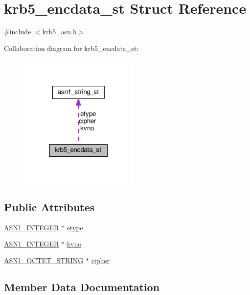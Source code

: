 \hypertarget{structkrb5__encdata__st}{}\section{krb5\+\_\+encdata\+\_\+st Struct Reference}
\label{structkrb5__encdata__st}


{\ttfamily \#include $<$krb5\+\_\+asn.\+h$>$}



Collaboration diagram for krb5\+\_\+encdata\+\_\+st\+:
\nopagebreak
\begin{figure}[H]
\begin{center}
\leavevmode
\includegraphics[width=169pt]{structkrb5__encdata__st__coll__graph}
\end{center}
\end{figure}
\subsection*{Public Attributes}
\begin{DoxyCompactItemize}
\item 
\hyperlink{ossl__typ_8h_af4335399bf9774cb410a5e93de65998b}{A\+S\+N1\+\_\+\+I\+N\+T\+E\+G\+ER} $\ast$ \hyperlink{structkrb5__encdata__st_aa930746062320a82be3d81e363dd4ebf}{etype}
\item 
\hyperlink{ossl__typ_8h_af4335399bf9774cb410a5e93de65998b}{A\+S\+N1\+\_\+\+I\+N\+T\+E\+G\+ER} $\ast$ \hyperlink{structkrb5__encdata__st_a30352f26d2741ac03df07c308f0bbb66}{kvno}
\item 
\hyperlink{ossl__typ_8h_afbd05e94e0f0430a2b729473efec88c1}{A\+S\+N1\+\_\+\+O\+C\+T\+E\+T\+\_\+\+S\+T\+R\+I\+NG} $\ast$ \hyperlink{structkrb5__encdata__st_a55de40ea971f2f93c618ea49322cbe0c}{cipher}
\end{DoxyCompactItemize}


\subsection{Member Data Documentation}
